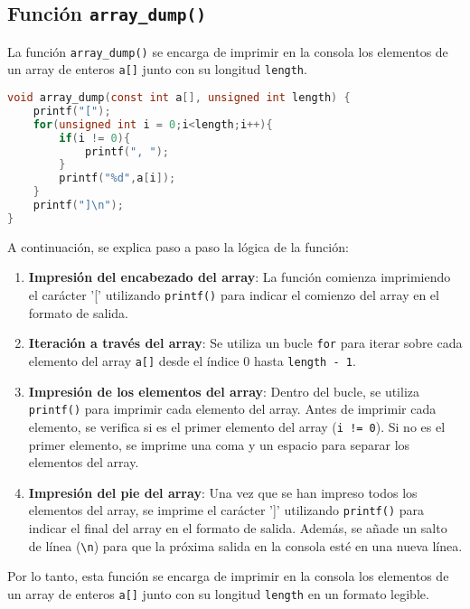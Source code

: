 \newpage
\subsection{Función \texttt{array\_dump()}}

La función \texttt{array\_dump()} se encarga de imprimir en la consola los elementos de un array de enteros \texttt{a[]} junto con su longitud \texttt{length}. 

\begin{lstlisting}[language=C]
void array_dump(const int a[], unsigned int length) {
    printf("[");
    for(unsigned int i = 0;i<length;i++){
        if(i != 0){
            printf(", ");
        }
        printf("%d",a[i]);
    }
    printf("]\n");
}
\end{lstlisting}

A continuación, se explica paso a paso la lógica de la función:

\begin{enumerate}
    \item \textbf{Impresión del encabezado del array}: La función comienza imprimiendo el carácter '[' utilizando \texttt{printf()} para indicar el comienzo del array en el formato de salida.
    
    \item \textbf{Iteración a través del array}: Se utiliza un bucle \texttt{for} para iterar sobre cada elemento del array \texttt{a[]} desde el índice 0 hasta \texttt{length - 1}.
    
    \item \textbf{Impresión de los elementos del array}: Dentro del bucle, se utiliza \texttt{printf()} para imprimir cada elemento del array. Antes de imprimir cada elemento, se verifica si es el primer elemento del array (\texttt{i != 0}). Si no es el primer elemento, se imprime una coma y un espacio para separar los elementos del array.
    
    \item \textbf{Impresión del pie del array}: Una vez que se han impreso todos los elementos del array, se imprime el carácter ']' utilizando \texttt{printf()} para indicar el final del array en el formato de salida. Además, se añade un salto de línea (\texttt{\textbackslash n}) para que la próxima salida en la consola esté en una nueva línea.
\end{enumerate}

Por lo tanto, esta función se encarga de imprimir en la consola los elementos de un array de enteros \texttt{a[]} junto con su longitud \texttt{length} en un formato legible.

